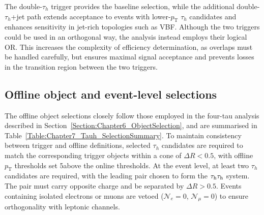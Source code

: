 The double-$\tau_h$ trigger provides the baseline selection, while the additional double-$\tau_h$+jet path extends acceptance to events with lower-$p_\text{T}$ $\tau_h$ candidates and enhances sensitivity in jet-rich topologies such as \ac{VBF}. Although the two triggers could be used in an orthogonal way, the analysis instead employs their logical OR. This increases the complexity of efficiency determination, as overlaps must be handled carefully, but ensures maximal signal acceptance and prevents losses in the transition region between the two triggers. 

\subsection{Offline object and event-level selections}
\label{Section:Chapter7_OfflineSelections}
The offline object selections closely follow those employed in the four-tau analysis described in Section~\ref{Section:Chapter6_ObjectSelection}, and are summarised in Table~\ref{Table:Chapter7_Tauh_SelectionSummary}. To maintain consistency between trigger and offline definitions, selected $\tau_h$ candidates are required to match the corresponding trigger objects within a cone of $\Delta R < 0.5$, with offline $p_\text{T}$ thresholds set 5\GeV above the online thresholds. At the event level, at least two $\tau_h$ candidates are required, with the leading pair chosen to form the $\tau_\mathrm{h}\tau_\mathrm{h}$ system. The pair must carry opposite charge and be separated by $\Delta R > 0.5$. Events containing isolated electrons or muons are vetoed ($\mathcal{N}_e = 0$, $\mathcal{N}_\mu = 0$) to ensure orthogonality with leptonic channels. 

